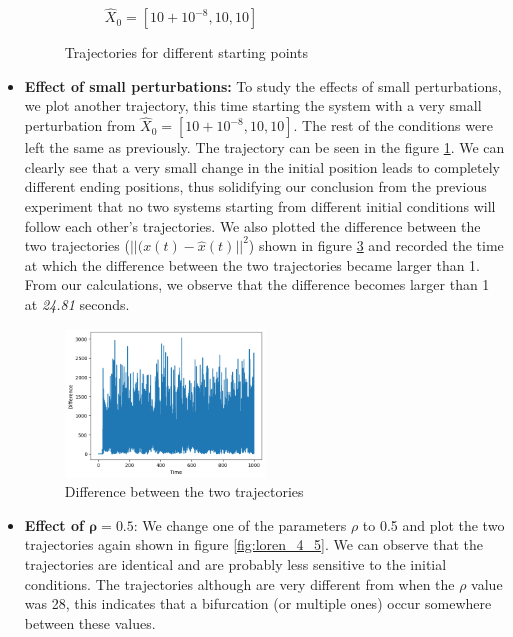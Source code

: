 \begin{itemize}
\begin{figure}[H]
\begin{subfigure}[b]{0.45\textwidth}
        \caption{$\hat{X}_{0}=[10+10^{-8},10,10]$}
        \label{fig:lorenz_2}
    \end{subfigure}
    \caption{Trajectories for different starting points}
    \label{fig:loren_1_2}
\end{figure}


\item \textbf{Effect of small perturbations:} To study the effects of small perturbations, we plot another trajectory, this time starting the system with a very small perturbation from $\hat{X}_{0}=[10+10^{-8},10,10]$. The rest of the conditions were left the same as previously. The trajectory can be seen in the figure \ref{fig:lorenz_2}. We can clearly see that a very small change in the initial position leads to completely different ending positions, thus solidifying our conclusion from the previous experiment that no two systems starting from different initial conditions will follow each other's trajectories. We also plotted the difference between the two trajectories (${||(x(t)-\hat{x}(t)||}^2$) shown in figure \ref{fig:difference} and recorded the time at which the difference between the two trajectories became larger than 1. From our calculations, we observe that the difference becomes larger than 1 at \textit{24.81} seconds.

\begin{figure} [H]
    \centering
    \includegraphics[width=0.5\textwidth]{images/ex4task4_lorenz_3.png}
    \caption{Difference between the two trajectories}
    \label{fig:difference}
\end{figure}

\item \textbf{Effect of $\mathbf{\rho = 0.5}$}: We change one of the parameters $\rho$ to 0.5 and plot the two trajectories again shown in figure \ref{fig:loren_4_5}. We can observe that the trajectories are identical and are probably less sensitive to the initial conditions. The trajectories although are very different from when the $\rho$ value was 28, this indicates that a bifurcation (or multiple ones) occur somewhere between these values.


\end{itemize}
